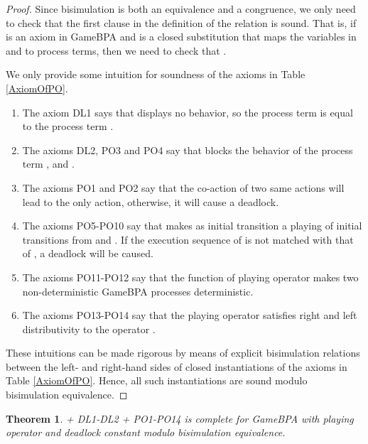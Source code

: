 \documentclass{fac}
\newtheorem{theorem}{Theorem}[section]
\begin{document}
\begin{proof}
Since bisimulation is both an equivalence and a congruence, we only need to check that the first clause in the definition of the relation  is sound.
That is, if  is an axiom in GameBPA and  is a closed substitution that maps the variables in  and  to process terms, then we need to check that .

We only provide some intuition for soundness of the axioms in Table \ref{AxiomOfPO}.

\begin{enumerate}
  \item The axiom DL1 says that  displays no behavior, so the process term  is equal to the process term .
  \item The axioms DL2, PO3 and PO4 say that  blocks the behavior of the process term ,  and .
  \item The axioms PO1 and PO2 say that the co-action of two same actions will lead to the only action, otherwise, it will cause a deadlock.
  \item The axioms PO5-PO10 say that  makes as initial transition a playing of initial transitions from  and . If the execution sequence of  is not matched with that of , a deadlock will be caused.
  \item The axioms PO11-PO12 say that the function of playing operator makes two non-deterministic GameBPA processes deterministic.
  \item The axioms PO13-PO14 say that the playing operator satisfies right and left distributivity to the operator .
\end{enumerate}

These intuitions can be made rigorous by means of explicit bisimulation relations between the left- and right-hand sides of closed instantiations of the axioms in Table \ref{AxiomOfPO}. Hence, all such instantiations are sound modulo bisimulation equivalence.
\end{proof}

\begin{theorem}
 + DL1-DL2 + PO1-PO14 is complete for GameBPA with playing operator and deadlock constant modulo bisimulation equivalence.
\end{theorem}
\end{document}
